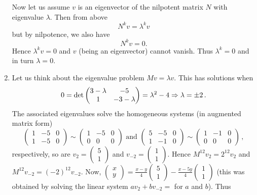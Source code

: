 \begin{enumerate}
Now let us assume $v$ is an eigenvector of the nilpotent matrix $N$ with eigenvalue $\lambda$. Then from above
\[
N^k v = \lambda^k v
\]
but by nilpotence, we also have
\[
N^k v = 0.
\]
Hence $\lambda^k v = 0$ and $v$ (being an eigenvector) cannot vanish. Thus $\lambda^k=0$ and in turn $\lambda=0$.

\item Let us think about the eigenvalue problem $Mv=\lambda v$. This has solutions when
\[
0={\rm det} \begin{pmatrix}3-\lambda & -5 \\ 1 & -3-\lambda\end{pmatrix}=\lambda^2-4\Rightarrow \lambda = \pm 2\, .
\]
The associated eigenvalues solve the homogeneous systems (in augmented matrix form)
\[
\left(\begin{array}{cc|c}1 & -5 & 0\\ 1 & -5 & 0\end{array}\right)\sim 
\left(\begin{array}{cc|c} 1 & -5 & 0\\ 0 & 0 & 0\end{array}\right)
\mbox{ and }
\left(\begin{array}{cc|c} 5 & -5 & 0\\ 1 & -1 & 0\end{array}\right)\sim 
\left(\begin{array}{cc|c} 1 & -1 & 0\\ 0 & 0 & 0\end{array}\right)\, ,\]
respectively, so are $v_2=\begin{pmatrix} 5 \\ 1 \end{pmatrix}$ and $v_{-2} = \begin{pmatrix} 1 \\ 1 \end{pmatrix}$.
Hence $M^{12} v_2 = 2^{12} v_2$ and $M^{12}v_{-2} = (-2)^{12} v_{-2}$. Now, $\begin{pmatrix} x \\ y \end{pmatrix}=\frac{x-y}{4}\begin{pmatrix} 5 \\ 1 \end{pmatrix} -\frac{x-5y}4  \begin{pmatrix} 1 \\ 1 \end{pmatrix}$
(this was obtained by solving the linear system $a v_2 + b v_{-2} = $ for $a$ and $b$). 
Thus

\end{enumerate}
